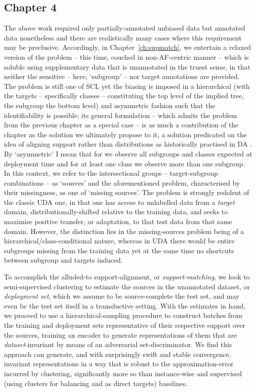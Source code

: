 \subsection*{Chapter 4}%
%
The above work required only partially-annotated unbiased data but annotated data nonetheless and
there are realistically many cases where this requirement may be preclusive.
%
Accordingly, in Chapter~\ref{ch:supmatch}, we entertain a relaxed version of the problem -- this
time, couched in non-\ac{AF}-centric manner -- which is soluble using supplementary data that is
unannotated in the truest sense, in that neither the sensitive -- here, `subgroup' -- nor target
annotations are provided.
%
The problem is still one of \ac{SCL} yet the biasing is imposed in a hierarchical (with the targets
-- specifically classes -- constituting the top level of the implied tree, the subgroup the bottom
level) and asymmetric fashion such that the identifiability is possible; its general formulation --
which admits the problem from the previous chapter as a special case -- is as much a contribution
of the chapter as the solution we ultimately propose to it, a solution predicated on the idea of
aligning support rather than distributions as historically practised in \acs{DA}
\citep{ben2006analysis}.
%
By `asymmetric' I mean that for we observe all subgroups and classes expected at deployment time
and for at least one class we observe more than one subgroup. 
%
In this context, we refer to the intersectional groups -- target-subgroup combinations -- as
`sources' and the aforementioned problem, characterised by their missingness, as one of `missing
sources'.
%
The problem is strongly redolent of the classic \ac{UDA} one, in that one has access to unlabelled
data from a \emph{target} domain, distributionally-shifted relative to the training data, and seeks
to maximise positive transfer, or adaptation, to that test data from that same domain.
%
However, the distinction lies in the missing-sources problem being of a
hierarchical/class-conditional nature, whereas in \ac{UDA} there would be entire subgroups missing
from the training data yet at the same time no shortcuts between subgroup and targets induced.

%
To accomplish the alluded-to support-alignment, or \emph{support-matching}, we look to
semi-supervised clustering to estimate the sources in the unannotated dataset, or \emph{deployment
set}, which we assume to be source-complete \wrt{} the test set, and may even be the test set
itself in a transductive setting.
%
With the estimates in hand, we proceed to use a hierarchical-sampling procedure to construct
batches from the training and deployment sets representative of their respective support over the
sources, training an encoder to generate representations of them that are \emph{dataset}-invariant
by means of an adversarial set-discriminator.
%
We find this approach can generate, and with surprisingly swift and stable convergence, invariant
representations in a way that is robust to the approximation-error incurred by clustering,
significantly more so than instance-wise and supervised (using clusters for balancing and as direct
targets) baselines.
%
